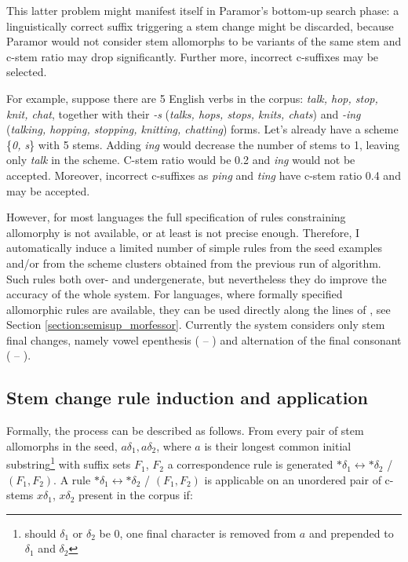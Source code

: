 This latter problem might manifest itself in Paramor's bottom-up search phase: a linguistically correct suffix triggering a stem change might be discarded, because Paramor would not consider stem allomorphs to be variants of the same stem and c-stem ratio may drop significantly. Further more, incorrect c-suffixes may be selected.

For example, suppose there are 5 English verbs in the corpus: \emph{talk, hop, stop, knit, chat}, together with their \emph{-s} (\emph{talks, hops, stops, knits, chats}) and \emph{-ing} (\emph{talking, hopping, stopping, knitting, chatting}) forms. Let's already have a scheme \{\emph{0, s}\} with 5 stems. Adding \emph{ing} would decrease the number of stems to 1, leaving only \emph{talk} in the scheme. C-stem ratio would be 0.2 and \emph{ing} would not be accepted. Moreover, incorrect c-suffixes as \emph{ping} and \emph{ting} have c-stem ratio 0.4 and may be accepted.


However, for most languages the full specification of rules constraining allomorphy is not available, or at least is not precise enough. Therefore, I automatically induce a limited number of simple rules from the seed examples and/or from the scheme clusters obtained from the previous run of algorithm. Such rules both over- and undergenerate, but nevertheless they do improve the accuracy of the whole system. For languages, where formally specified allomorphic rules are available, they can be used directly along the lines of
\cite{tepper10,tepper-xia-2008}, see Section \ref{section:semisup_morfessor}.
%
Currently the system  considers only stem final changes, namely vowel epenthesis (\eg
{} -- ) and alternation of the final consonant (\eg {} -- ). %


\subsection{Stem change rule induction and application}
Formally, the process can be described as follows.
From every pair of stem allomorphs in the seed, $a\delta_1, a\delta_2$, where $a$ is their longest common initial substring\footnote{should $\delta_1$ or $\delta_2$ be 0, one final character is removed from $a$ and prepended to $\delta_1$ and $\delta_2$} 
with suffix sets $F_1$, $F_2$  a correspondence rule is generated $*\delta_1 \leftrightarrow *\delta_2$ / $(F_1, F_2)$. A rule $*\delta_1 \leftrightarrow *\delta_2$ / $(F_1, F_2)$ is applicable on an unordered pair of c-stems {$x\delta_1$, $x\delta_2$} present in the corpus if:

